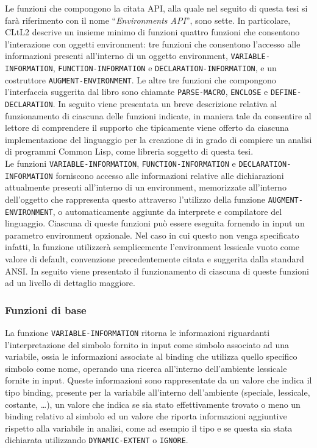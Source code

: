 Le funzioni che compongono la citata API, alla quale nel seguito di questa tesi
si farà riferimento con il nome \enquote{\textit{Environments API}}, sono sette.
In particolare, CLtL2 descrive un insieme minimo di funzioni quattro funzioni
che consentono l’interazione con oggetti environment: tre funzioni che
consentono l’accesso alle informazioni presenti all’interno di un oggetto
environment, \texttt{VARIABLE-INFORMATION}, \texttt{FUNCTION-INFORMATION} e
\texttt{DECLARATION-INFORMATION}, e un costruttore
\texttt{AUGMENT-ENVIRONMENT}. Le altre tre funzioni che compongono l’interfaccia
suggerita dal libro sono chiamate \texttt{PARSE-MACRO}, \texttt{ENCLOSE} e
\texttt{DEFINE-DECLARATION}. In seguito viene presentata un breve descrizione
relativa al funzionamento di ciascuna delle funzioni indicate, in maniera tale
da consentire al lettore di comprendere il supporto che tipicamente viene
offerto da ciascuna implementazione del linguaggio per la creazione di in grado
di compiere un analisi di programmi Common Lisp, come libreria soggetto di
questa tesi.\\

Le funzioni \texttt{VARIABLE-INFORMATION}, \texttt{FUNCTION-INFORMATION} e
\texttt{DECLARATION-INFORMATION} forniscono accesso alle informazioni relative
alle dichiarazioni attualmente presenti all’interno di un environment,
memorizzate all’interno dell’oggetto che rappresenta questo attraverso
l’utilizzo della funzione \texttt{AUGMENT-ENVIRONMENT}, o automaticamente
aggiunte da interprete e compilatore del linguaggio. Ciascuna di queste funzioni
può essere eseguita fornendo in input un parametro environment opzionale. Nel
caso in cui questo non venga specificato infatti, la funzione utilizzerà
semplicemente l’environment lessicale vuoto come valore di default, convenzione
precedentemente citata e suggerita dalla standard ANSI. In seguito viene
presentato il funzionamento di ciascuna di queste funzioni ad un livello di
dettaglio maggiore.

\subsubsection{Funzioni di base}

La funzione \texttt{VARIABLE-INFORMATION} ritorna le informazioni riguardanti
l’interpretazione del simbolo fornito in input come simbolo associato ad una
variabile, ossia le informazioni associate al binding che utilizza quello
specifico simbolo come nome, operando una ricerca all’interno dell'ambiente
lessicale fornite in input. Queste informazioni sono rappresentate da un valore
che indica il tipo binding, presente per la variabile all’interno dell’ambiente
(speciale, lessicale, costante, \dots), un valore che indica se sia stato
effettivamente trovato o meno un binding relativo al simbolo ed un valore che
riporta informazioni aggiuntive rispetto alla variabile in analisi, come ad
esempio il tipo e se questa sia stata dichiarata utilizzando
\texttt{DYNAMIC-EXTENT} o \texttt{IGNORE}.\\

